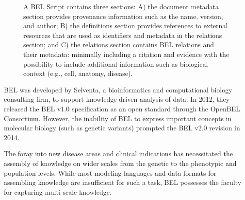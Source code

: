 \begin{figure}
    \captionsetup{format=plain}
    \caption[The Schema of a BEL Script]{A BEL Script contains three sections: A) the document metadata section provides provenance information such as the name, version, and author; B) the definitions section provides references to external resources that are used as identifiers and metadata in the relations section; and C) the relations section contains BEL relations and their metadata: minimally including a citation and evidence with the possibility to include additional information such as biological context (e.g., cell, anatomy, disease).}
    \label{fig:bel_script}
\end{figure}

BEL was developed by Selventa, a bioinformatics and computational biology consulting firm, to support knowledge-driven analysis of data.
In 2012, they released the \ac{BEL} v1.0 specification as an open standard through the OpenBEL Consortium.
However, the inability of BEL to express important concepts in molecular biology (such as genetic variants) prompted the \ac{BEL} v2.0 revision in 2014.

The foray into new disease areas and clinical indications has necessitated the assembly of knowledge on wider scales from the genetic to the phenotypic and population levels.
While most modeling languages and data formats for assembling knowledge are insufficient for such a task, BEL possesses the faculty for capturing multi-scale knowledge.

